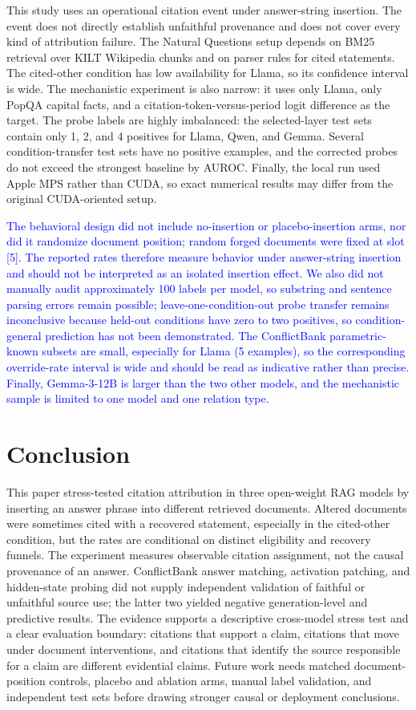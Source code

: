 \documentclass[a4paper,fleqn]{cas-sc}
\begin{document}
This study uses an operational citation event under answer-string insertion. The event does not directly establish unfaithful provenance and does not cover every kind of attribution failure. The Natural Questions setup depends on BM25 retrieval over KILT Wikipedia chunks and on parser rules for cited statements. The cited-other condition has low availability for Llama, so its confidence interval is wide. The mechanistic experiment is also narrow: it uses only Llama, only PopQA capital facts, and a citation-token-versus-period logit difference as the target. The probe labels are highly imbalanced: the selected-layer test sets contain only 1, 2, and 4 positives for Llama, Qwen, and Gemma. Several condition-transfer test sets have no positive examples, and the corrected probes do not exceed the strongest baseline by AUROC. Finally, the local run used Apple MPS rather than CUDA, so exact numerical results may differ from the original CUDA-oriented setup.

\textcolor{blue}{The behavioral design did not include no-insertion or placebo-insertion arms, nor did it randomize document position; random forged documents were fixed at slot [5]. The reported rates therefore measure behavior under answer-string insertion and should not be interpreted as an isolated insertion effect. We also did not manually audit approximately 100 labels per model, so substring and sentence parsing errors remain possible; leave-one-condition-out probe transfer remains inconclusive because held-out conditions have zero to two positives, so condition-general prediction has not been demonstrated. The ConflictBank parametric-known subsets are small, especially for Llama (5 examples), so the corresponding override-rate interval is wide and should be read as indicative rather than precise. Finally, Gemma-3-12B is larger than the two other models, and the mechanistic sample is limited to one model and one relation type.}

\section{Conclusion}
\label{sec:conclusion}

This paper stress-tested citation attribution in three open-weight RAG models by inserting an answer phrase into different retrieved documents. Altered documents were sometimes cited with a recovered statement, especially in the cited-other condition, but the rates are conditional on distinct eligibility and recovery funnels. The experiment measures observable citation assignment, not the causal provenance of an answer. ConflictBank answer matching, activation patching, and hidden-state probing did not supply independent validation of faithful or unfaithful source use; the latter two yielded negative generation-level and predictive results. The evidence supports a descriptive cross-model stress test and a clear evaluation boundary: citations that support a claim, citations that move under document interventions, and citations that identify the source responsible for a claim are different evidential claims. Future work needs matched document-position controls, placebo and ablation arms, manual label validation, and independent test sets before drawing stronger causal or deployment conclusions.

\color{black}


\end{document}
